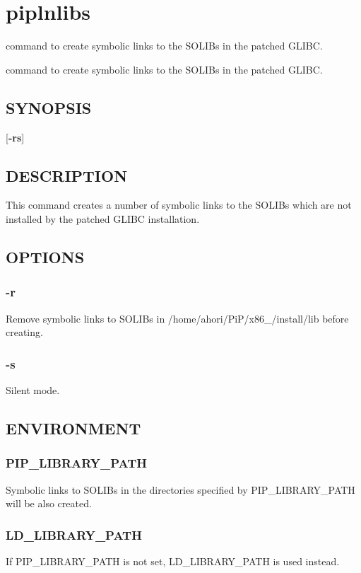 \hypertarget{group__piplnlibs}{\section{piplnlibs}
\label{group__piplnlibs}
}


command to create symbolic links to the S\-O\-L\-I\-Bs in the patched G\-L\-I\-B\-C.  


command to create symbolic links to the S\-O\-L\-I\-Bs in the patched G\-L\-I\-B\-C. \hypertarget{group__piplnlibs_synopsis}{}\subsection{S\-Y\-N\-O\-P\-S\-I\-S}\label{group__piplnlibs_synopsis}
{ }\mbox{[}{\bfseries -\/rs}\mbox{]}\hypertarget{group__piplnlibs_description}{}\subsection{D\-E\-S\-C\-R\-I\-P\-T\-I\-O\-N}\label{group__piplnlibs_description}
This command creates a number of symbolic links to the S\-O\-L\-I\-Bs which are not installed by the patched G\-L\-I\-B\-C installation.\hypertarget{group__piplnlibs_options}{}\subsection{O\-P\-T\-I\-O\-N\-S}\label{group__piplnlibs_options}
\hypertarget{group__piplnlibs_remove}{}\subsubsection{-\/r}\label{group__piplnlibs_remove}
Remove symbolic links to S\-O\-L\-I\-Bs in /home/ahori/\-Pi\-P/x86\-\_/install/lib before creating.\hypertarget{group__piplnlibs_silent}{}\subsubsection{-\/s}\label{group__piplnlibs_silent}
Silent mode.\hypertarget{group__piplnlibs_environment}{}\subsection{E\-N\-V\-I\-R\-O\-N\-M\-E\-N\-T}\label{group__piplnlibs_environment}
\hypertarget{group__piplnlibs_PIP_LIBRARY_PATH}{}\subsubsection{P\-I\-P\-\_\-\-L\-I\-B\-R\-A\-R\-Y\-\_\-\-P\-A\-T\-H}\label{group__piplnlibs_PIP_LIBRARY_PATH}
Symbolic links to S\-O\-L\-I\-Bs in the directories specified by P\-I\-P\-\_\-\-L\-I\-B\-R\-A\-R\-Y\-\_\-\-P\-A\-T\-H will be also created.\hypertarget{group__piplnlibs_LD_LIBRARY_PATH}{}\subsubsection{L\-D\-\_\-\-L\-I\-B\-R\-A\-R\-Y\-\_\-\-P\-A\-T\-H}\label{group__piplnlibs_LD_LIBRARY_PATH}
If P\-I\-P\-\_\-\-L\-I\-B\-R\-A\-R\-Y\-\_\-\-P\-A\-T\-H is not set, L\-D\-\_\-\-L\-I\-B\-R\-A\-R\-Y\-\_\-\-P\-A\-T\-H is used instead. 